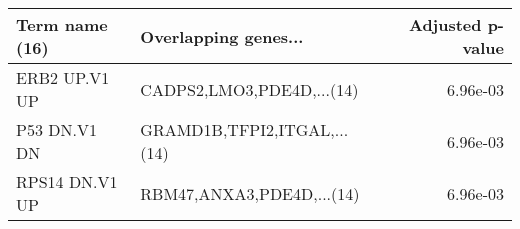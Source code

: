 \begin{tabular}{llr}
\toprule
Term name (16) &        Overlapping genes... &  Adjusted p-value \\
\midrule
 ERB2 UP.V1 UP &   CADPS2,LMO3,PDE4D,...(14) &          6.96e-03 \\
  P53 DN.V1 DN & GRAMD1B,TFPI2,ITGAL,...(14) &          6.96e-03 \\
RPS14 DN.V1 UP &   RBM47,ANXA3,PDE4D,...(14) &          6.96e-03 \\
\bottomrule
\end{tabular}
